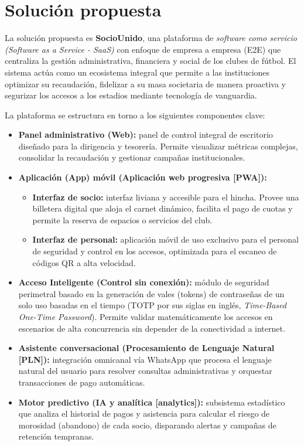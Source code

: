 \section{Solución propuesta}

La solución propuesta es \textbf{SocioUnido}, una plataforma de \textit{software como servicio (Software as a Service - SaaS)} con enfoque de empresa a empresa (E2E) que centraliza la gestión administrativa, financiera y social de los clubes de fútbol. El sistema actúa como un ecosistema integral que permite a las instituciones optimizar su recaudación, fidelizar a su masa societaria de manera proactiva y segurizar los accesos a los estadios mediante tecnología de vanguardia.

La plataforma se estructura en torno a los siguientes componentes clave:

\begin{itemize}
    \item \textbf{Panel administrativo (Web):} panel de control integral de escritorio diseñado para la dirigencia y tesorería. Permite visualizar métricas complejas, consolidar la recaudación y gestionar campañas institucionales.
    \item \textbf{Aplicación (App) móvil (Aplicación web progresiva [PWA]):}
    \begin{itemize}
        \item \textbf{Interfaz de socio:} interfaz liviana y accesible para el hincha. Provee una billetera digital que aloja el carnet dinámico, facilita el pago de cuotas y permite la reserva de espacios o servicios del club.
        \item \textbf{Interfaz de personal:} aplicación móvil de uso exclusivo para el personal de seguridad y control en los accesos, optimizada para el escaneo de códigos QR a alta velocidad.
    \end{itemize}
    \item \textbf{Acceso Inteligente (Control sin conexión):} módulo de seguridad perimetral basado en la generación de vales (tokens) de contraseñas de un solo uso basadas en el tiempo (TOTP por sus siglas en inglés, \textit{Time-Based One-Time Password}). Permite validar matemáticamente los accesos en escenarios de alta concurrencia sin depender de la conectividad a internet.
    \item \textbf{Asistente conversacional (Procesamiento de Lenguaje Natural [PLN]):} integración omnicanal vía WhatsApp que procesa el lenguaje natural del usuario para resolver consultas administrativas y orquestar transacciones de pago automáticas.
    \item \textbf{Motor predictivo (IA y analítica [analytics]):} subsistema estadístico que analiza el historial de pagos y asistencia para calcular el riesgo de morosidad (abandono) de cada socio, disparando alertas y campañas de retención tempranas.
\end{itemize}

